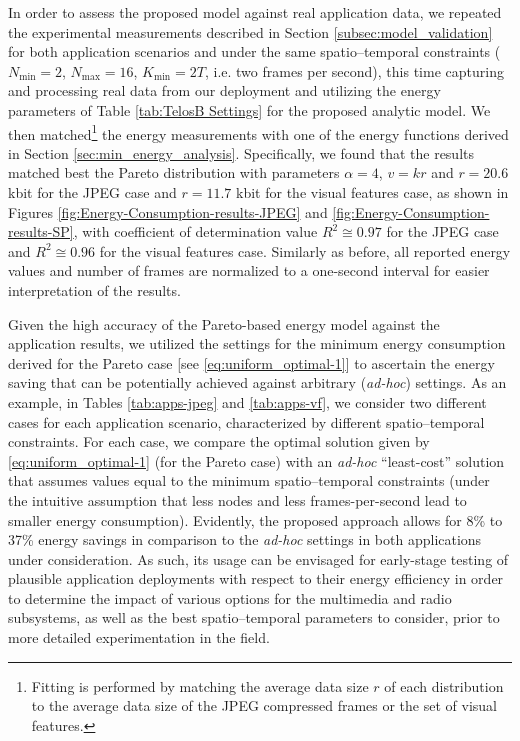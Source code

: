 \documentclass[twocolumn,english]{IEEEtran}
\theoremstyle{plain}
\theoremstyle{definition}
\begin{document}
In order to assess the proposed model against real application data,
we repeated the experimental measurements described in Section \ref{subsec:model_validation}
for both application scenarios and under the same spatio--temporal
constraints ($N_{\min}=2$, $N_{\max}=16$, $K_{\min}=2T$, i.e. two
frames per second), this time capturing and processing real data from
our deployment and utilizing the energy parameters of Table \ref{tab:TelosB Settings}
for the proposed analytic model. We then matched\footnote{Fitting is performed by matching the average data size $r$ of each
distribution to the average data size of the JPEG compressed frames
or the set of visual features.} the energy measurements with one of the energy functions derived
in Section \ref{sec:min_energy_analysis}. Specifically, we found
that the results matched best the Pareto distribution with parameters
$\alpha=4$, $v=kr$ and $r=20.6$ kbit for the JPEG case and $r=11.7$
kbit for the visual features case, as shown in Figures \ref{fig:Energy-Consumption-results-JPEG}
and \ref{fig:Energy-Consumption-results-SP}, with coefficient of
determination value $R^{2}\cong0.97$ for the JPEG case and $R^{2}\cong0.96$
for the visual features case. Similarly as before, all reported energy
values and number of frames are normalized to a one-second interval
for easier interpretation of the results.

Given the high accuracy of the Pareto-based energy model against the
application results, we utilized the settings for the minimum energy
consumption derived for the Pareto case {[}see \eqref{eq:uniform_optimal-1}{]}
to ascertain the energy saving that can be potentially achieved against
arbitrary (\emph{ad-hoc}) settings. As an example, in Tables \ref{tab:apps-jpeg}
and \ref{tab:apps-vf}, we consider two different cases for each application
scenario, characterized by different spatio--temporal constraints.
For each case, we compare the optimal solution given by \eqref{eq:uniform_optimal-1}
(for the Pareto case) with an\emph{ ad-hoc} ``least-cost'' solution
that assumes values equal to the minimum spatio--temporal constraints
(under the intuitive assumption that less nodes and less frames-per-second
lead to smaller energy consumption). Evidently, the proposed approach
allows for 8\% to 37\% energy savings in comparison to the \emph{ad-hoc}
settings in both applications under consideration. As such, its usage
can be envisaged for early-stage testing of plausible application
deployments with respect to their energy efficiency in order to determine
the impact of various options for the multimedia and radio subsystems,
as well as the best spatio--temporal parameters to consider, prior
to more detailed experimentation in the field.
\end{document}
